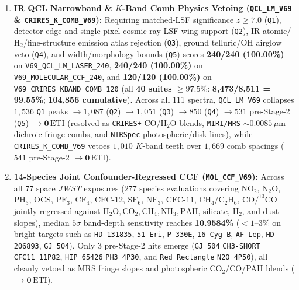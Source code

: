 \documentclass[twocolumn,10pt]{article}
\begin{document}
\begin{enumerate}\setlength{\itemsep}{2pt}\setlength{\parskip}{0pt}
  \item \textbf{IR QCL Narrowband \& $K$-Band Comb Physics Vetoing (\texttt{QCL\_LM\_V69} \& \texttt{CRIRES\_K\_COMB\_V69}):} Requiring matched-LSF significance $z\ge 7.0$ (\texttt{Q1}), detector-edge and single-pixel cosmic-ray LSF wing support (\texttt{Q2}), IR atomic/$\mathrm{H_2}$/fine-structure emission atlas rejection (\texttt{Q3}), ground telluric/OH airglow veto (\texttt{Q4}), and width/morphology bounds (\texttt{Q5}) scores \textbf{240/240 (100.00\%)} on \texttt{V69\_QCL\_LM\_LASER\_240}, \textbf{240/240 (100.00\%)} on \texttt{V69\_MOLECULAR\_CCF\_240}, and \textbf{120/120 (100.00\%)} on \texttt{V69\_CRIRES\_KBAND\_COMB\_120} (all \textbf{40 suites $\ge 97.5\%$}: \textbf{8,473/8,511 = 99.55\%}; \textbf{104,856 cumulative}). Across all 111 spectra, \texttt{QCL\_LM\_V69} collapses $1{,}536$ \texttt{Q1} peaks $\rightarrow 1{,}087$ (\texttt{Q2}) $\rightarrow 1{,}051$ (\texttt{Q3}) $\rightarrow 850$ (\texttt{Q4}) $\rightarrow 531$ pre-Stage-2 (\texttt{Q5}) $\rightarrow \mathbf{0\,\mathrm{ETI}}$ (resolved as \texttt{CRIRES+} CO/$\mathrm{H_2O}$ blends, \texttt{MIRI/MRS} $\sim 0.0085\,\mu\text{m}$ dichroic fringe combs, and \texttt{NIRSpec} photospheric/disk lines), while \texttt{CRIRES\_K\_COMB\_V69} vetoes $1{,}010$ $K$-band teeth over $1{,}669$ comb spacings ($541$ pre-Stage-2 $\rightarrow \mathbf{0\,\mathrm{ETI}}$).
  \item \textbf{14-Species Joint Confounder-Regressed CCF (\texttt{MOL\_CCF\_V69}):} Across all $77$ space \textit{JWST} exposures ($277$ species evaluations covering $\mathrm{NO_2}$, $\mathrm{N_2O}$, $\mathrm{PH_3}$, $\mathrm{OCS}$, $\mathrm{PF_3}$, $\mathrm{CF_4}$, $\mathrm{CFC\text{-}12}$, $\mathrm{SF_6}$, $\mathrm{NF_3}$, $\mathrm{CFC\text{-}11}$, $\mathrm{CH_4/C_2H_6}$, $\mathrm{CO/^{13}CO}$ jointly regressed against $\mathrm{H_2O, CO_2, CH_4, NH_3, PAH}$, silicate, $\mathrm{H_2}$, and dust slopes), median $5\sigma$ band-depth sensitivity reaches \textbf{10.9584\%} ($<1\text{--}3\%$ on bright targets such as \texttt{HD\,131835}, \texttt{51\,Eri}, \texttt{P\,330E}, \texttt{16\,Cyg\,B}, \texttt{AF\,Lep}, \texttt{HD\,206893}, \texttt{GJ\,504}). Only $3$ pre-Stage-2 hits emerge (\texttt{GJ\,504} \texttt{CH3-SHORT} \texttt{CFC11\_11P82}, \texttt{HIP\,65426} \texttt{PH3\_4P30}, and \texttt{Red\,Rectangle} \texttt{N2O\_4P50}), all cleanly vetoed as MRS fringe slopes and photospheric $\mathrm{CO_2}$/CO/PAH blends ($\rightarrow \mathbf{0\,\mathrm{ETI}}$).

\end{enumerate}
\end{document}
